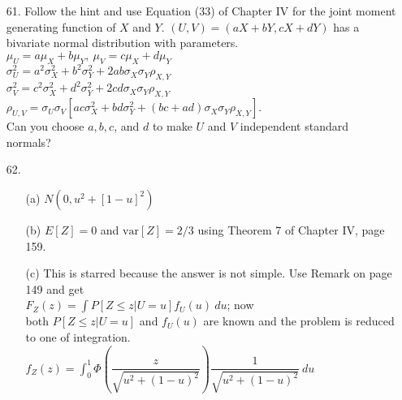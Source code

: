 \begin{enumerate}
	\item[61.] Follow the hint and use Equation (33) of Chapter IV for the joint moment generating function of $X$ and $Y$. $(U,V) = (aX + bY, cX +dY)$ has a bivariate normal distribution with parameters. \\
	$\mu_U = a\mu_X + b\mu_Y,\ \mu_V = c\mu_X + d\mu_Y$ \\
	$\sigma^2_U = a^2\sigma^2_X + b^2\sigma^2_Y + 2ab\sigma_X\sigma_Y\rho_{X,Y}$ \\
	$\sigma^2_V = c^2\sigma^2_X + d^2\sigma^2_Y + 2cd\sigma_X\sigma_Y\rho_{X,Y}$ \\
	$\rho_{U,V} = \sigma_U\sigma_V[ac\sigma^2_X + bd\sigma^2_Y + (bc+ad)\sigma_X\sigma_Y\rho_{X,Y}]$. \\
	Can you choose $a, b, c$, and $d$ to make $U$ and $V$ independent standard normals?
	
	\item[62.] \begin{itemize}
		\item[(a)] $N(0, u^2+[1-u]^2)$
		\item[(b)] $E[Z]=0$ and $\mbox{var}[Z]=2/3$ using Theorem 7 of Chapter IV, page 159.
		\item[(c)] This is starred because the answer is not simple. Use Remark on page 149 and get \\
		$\displaystyle F_Z(z) = \int P[Z\le z\vert U=u]f_U(u)\ du$; now \\
		both $P[Z\le z\vert U=u]$ and $f_U(u)$ are known and the problem is reduced to one of integration. \\
		$\displaystyle f_Z(z) = \int_{0}^{1}\Phi\left(\dfrac{z}{\sqrt{u^2+(1-u)^2}}\right) \dfrac{1}{\sqrt{u^2+(1-u)^2}}\ du$
	\end{itemize}
	
	\newpage
	
\end{enumerate}